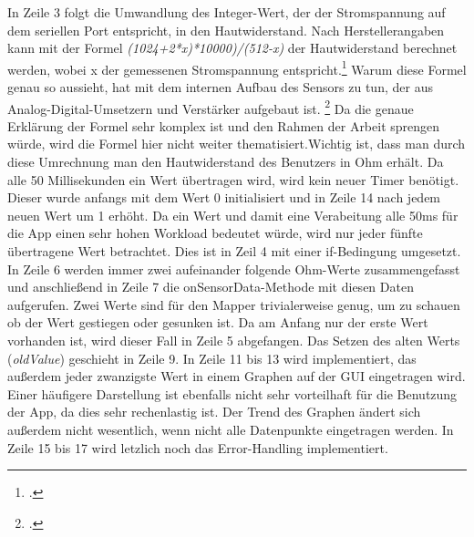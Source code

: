 In Zeile 3 folgt die Umwandlung des Integer-Wert, der der Stromspannung auf dem seriellen Port entspricht, in den Hautwiderstand. \newline Nach Herstellerangaben kann mit der Formel \textit{(1024+2*x)*10000)/(512-x)} der Hautwiderstand berechnet werden, wobei x der gemessenen Stromspannung entspricht.\footcite[Vgl.][]{Gro18} Warum diese Formel genau so aussieht, hat mit dem internen Aufbau des Sensors zu tun, der aus Analog-Digital-Umsetzern und Verstärker aufgebaut ist. \footcite[Vgl.][1. Forumsantwort]{Com18} Da die genaue Erklärung der Formel sehr komplex ist und den Rahmen der Arbeit sprengen würde, wird die Formel hier nicht weiter thematisiert.Wichtig ist, dass man durch diese Umrechnung man den Hautwiderstand des Benutzers in Ohm erhält. \newline
Da alle 50 Millisekunden ein Wert übertragen wird, wird kein neuer Timer benötigt. Dieser wurde anfangs mit dem Wert 0 initialisiert und in Zeile 14 nach jedem neuen Wert um 1 erhöht. Da ein Wert und damit eine Verabeitung alle 50ms für die App einen sehr hohen Workload bedeutet würde, wird nur jeder fünfte übertragene Wert betrachtet. Dies ist in Zeil 4 mit einer if-Bedingung umgesetzt. In Zeile 6 werden immer zwei aufeinander folgende Ohm-Werte zusammengefasst und anschließend in Zeile 7 die onSensorData-Methode mit diesen Daten aufgerufen. Zwei Werte sind für den Mapper trivialerweise genug, um zu schauen ob der Wert gestiegen oder gesunken ist. Da am Anfang nur der erste Wert vorhanden ist, wird dieser Fall in Zeile 5 abgefangen. Das Setzen des alten Werts (\textit{oldValue}) geschieht in Zeile 9. \newline
In Zeile 11 bis 13 wird implementiert, das außerdem jeder zwanzigste Wert in einem Graphen auf der GUI eingetragen wird. Einer häufigere Darstellung ist ebenfalls nicht sehr vorteilhaft für die Benutzung der App, da dies sehr rechenlastig ist. Der Trend des Graphen ändert sich außerdem nicht wesentlich, wenn nicht alle Datenpunkte eingetragen werden. \newline
In Zeile 15 bis 17 wird letzlich noch das Error-Handling implementiert.

